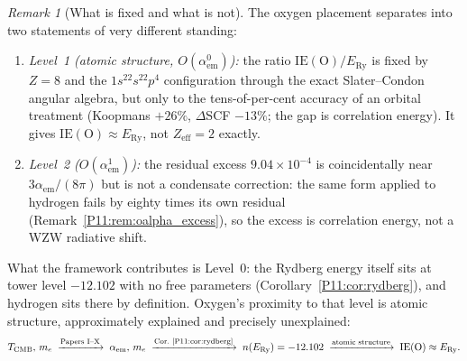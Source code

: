 \documentclass[11pt,a4paper]{article}
\theoremstyle{definition}
\theoremstyle{remark}
\newtheorem{remark}[theorem]{Remark}
\newcommand{\TCMB}{T_{\mathrm{CMB}}}
\newcommand{\ERy}{E_{\mathrm{Ry}}}
\newcommand{\aem}{\alpha_{\mathrm{em}}}
\newcommand{\IE}{\mathrm{IE}}
\begin{document}
\begin{remark}[What is fixed and what is not]
\label{P11:rem:two_level}
The oxygen placement separates into two statements of very different
standing:
\begin{enumerate}[noitemsep]
\item \emph{Level~1 (atomic structure, $O(\aem^0)$):}
  the ratio $\IE(\mathrm{O})/\ERy$ is fixed by $Z=8$ and the
  $1s^22s^22p^4$ configuration through the exact Slater--Condon
  angular algebra, but only to the tens-of-per-cent accuracy of an
  orbital treatment (Koopmans $+26\%$, $\Delta$SCF $-13\%$; the gap is
  correlation energy).  It gives $\IE(\mathrm{O}) \approx \ERy$, not
  $Z_\mathrm{eff}=2$ exactly.
\item \emph{Level~2 ($O(\aem^1)$):}
  the residual excess $9.04\times10^{-4}$ is coincidentally near
  $3\aem/(8\pi)$ but is not a condensate correction: the same form
  applied to hydrogen fails by eighty times its own residual
  (Remark~\ref{P11:rem:oalpha_excess}), so the excess is
  correlation energy, not a WZW radiative shift.
\end{enumerate}
What the framework contributes is Level~0: the Rydberg energy itself
sits at tower level $-12.102$ with no free parameters
(Corollary~\ref{P11:cor:rydberg}), and hydrogen sits there by
definition.  Oxygen's proximity to that level is atomic structure,
approximately explained and precisely unexplained:
\[
  \TCMB,\, m_e
  \;\xrightarrow{\text{Papers I--X}}\;
  \aem,\, m_e
  \;\xrightarrow{\text{Cor.~\ref{P11:cor:rydberg}}}\;
  n(\ERy) = -12.102
  \;\xrightarrow{\text{atomic structure}}\;
  \IE(\mathrm{O}) \approx \ERy .
\]
\end{remark}
\end{document}
